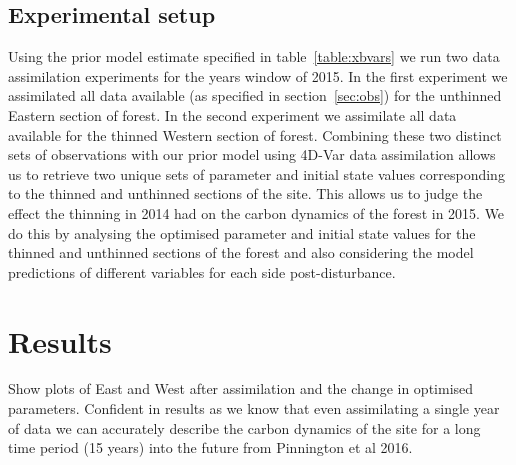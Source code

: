 \documentclass[11pt]{article}
\begin{document}

\subsection{Experimental setup}


Using the prior model estimate specified in table~\ref{table:xbvars} we run two data assimilation experiments for the years window of 2015. In the first experiment we assimilated all data available (as specified in section~\ref{sec:obs}) for the unthinned Eastern section of forest. In the second experiment we assimilate all data available for the thinned Western section of forest. Combining these two distinct sets of observations with our prior model using 4D-Var data assimilation allows us to retrieve two unique sets of parameter and initial state values corresponding to the thinned and unthinned sections of the site. This allows us to judge the effect the thinning in 2014 had on the carbon dynamics of the forest in 2015. We do this by analysing the optimised parameter and initial state values for the thinned and unthinned sections of the forest and also considering the model predictions of different variables for each side post-disturbance. 

\section{Results} \label{sec:results}
Show plots of East and West after assimilation and the change in optimised parameters. Confident in results as we know that even assimilating a single year of data we can accurately describe the carbon dynamics of the site for a long time period (15 years) into the future from Pinnington et al 2016.
\end{document}
